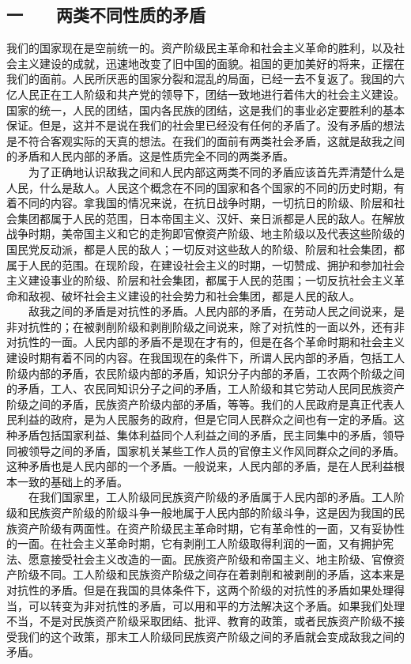 \documentclass[cn,11pt,chinese]{elegantbook}
\def\myformat#1{\hfil\hfil #1}
\begin{document}
\subsection*{\myformat{一　　两类不同性质的矛盾}}
我们的国家现在是空前统一的。资产阶级民主革命和社会主义革命的胜利，以及社会主义建设的成就，迅速地改变了旧中国的面貌。祖国的更加美好的将来，正摆在我们的面前。人民所厌恶的国家分裂和混乱的局面，已经一去不复返了。我国的六亿人民正在工人阶级和共产党的领导下，团结一致地进行着伟大的社会主义建设。国家的统一，人民的团结，国内各民族的团结，这是我们的事业必定要胜利的基本保证。但是，这并不是说在我们的社会里已经没有任何的矛盾了。没有矛盾的想法是不符合客观实际的天真的想法。在我们的面前有两类社会矛盾，这就是敌我之间的矛盾和人民内部的矛盾。这是性质完全不同的两类矛盾。\\
　　为了正确地认识敌我之间和人民内部这两类不同的矛盾应该首先弄清楚什么是人民，什么是敌人。人民这个概念在不同的国家和各个国家的不同的历史时期，有着不同的内容。拿我国的情况来说，在抗日战争时期，一切抗日的阶级、阶层和社会集团都属于人民的范围，日本帝国主义、汉奸、亲日派都是人民的敌人。在解放战争时期，美帝国主义和它的走狗即官僚资产阶级、地主阶级以及代表这些阶级的国民党反动派，都是人民的敌人；一切反对这些敌人的阶级、阶层和社会集团，都属于人民的范围。在现阶段，在建设社会主义的时期，一切赞成、拥护和参加社会主义建设事业的阶级、阶层和社会集团，都属于人民的范围；一切反抗社会主义革命和敌视、破坏社会主义建设的社会势力和社会集团，都是人民的敌人。\\
　　敌我之间的矛盾是对抗性的矛盾。人民内部的矛盾，在劳动人民之间说来，是非对抗性的；在被剥削阶级和剥削阶级之间说来，除了对抗性的一面以外，还有非对抗性的一面。人民内部的矛盾不是现在才有的，但是在各个革命时期和社会主义建设时期有着不同的内容。在我国现在的条件下，所谓人民内部的矛盾，包括工人阶级内部的矛盾，农民阶级内部的矛盾，知识分子内部的矛盾，工农两个阶级之间的矛盾，工人、农民同知识分子之间的矛盾，工人阶级和其它劳动人民同民族资产阶级之间的矛盾，民族资产阶级内部的矛盾，等等。我们的人民政府是真正代表人民利益的政府，是为人民服务的政府，但是它同人民群众之间也有一定的矛盾。这种矛盾包括国家利益、集体利益同个人利益之间的矛盾，民主同集中的矛盾，领导同被领导之间的矛盾，国家机关某些工作人员的官僚主义作风同群众之间的矛盾。这种矛盾也是人民内部的一个矛盾。一般说来，人民内部的矛盾，是在人民利益根本一致的基础上的矛盾。\\
　　在我们国家里，工人阶级同民族资产阶级的矛盾属于人民内部的矛盾。工人阶级和民族资产阶级的阶级斗争一般地属于人民内部的阶级斗争，这是因为我国的民族资产阶级有两面性。在资产阶级民主革命时期，它有革命性的一面，又有妥协性的一面。在社会主义革命时期，它有剥削工人阶级取得利润的一面，又有拥护宪法、愿意接受社会主义改造的一面。民族资产阶级和帝国主义、地主阶级、官僚资产阶级不同。工人阶级和民族资产阶级之间存在着剥削和被剥削的矛盾，这本来是对抗性的矛盾。但是在我国的具体条件下，这两个阶级的对抗性的矛盾如果处理得当，可以转变为非对抗性的矛盾，可以用和平的方法解决这个矛盾。如果我们处理不当，不是对民族资产阶级采取团结、批评、教育的政策，或者民族资产阶级不接受我们的这个政策，那末工人阶级同民族资产阶级之间的矛盾就会变成敌我之间的矛盾。\\
\end{document}
